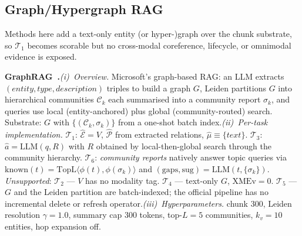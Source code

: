 \documentclass{article}
\begin{document}
\subsection{Graph/Hypergraph RAG}\label{app:b-graph}

Methods here add a text-only entity (or hyper-)graph over the chunk substrate, so $\mathcal{T}_1$ becomes scorable but no cross-modal coreference, lifecycle, or omnimodal evidence is exposed.

\noindent\textbf{GraphRAG~\citep{GraphRAG}.}\quad\emph{(i)~Overview.} Microsoft's graph-based RAG: an LLM extracts $(entity, type, description)$ triples to build a graph $G$, Leiden partitions $G$ into hierarchical communities $\mathcal{C}_k$ each summarised into a community report $\sigma_k$, and queries use local (entity-anchored) plus global (community-routed) search. Substrate: $G$ with $\{(\mathcal{C}_k,\sigma_k)\}$ from a one-shot batch index.\quad\emph{(ii)~Per-task implementation.} $\mathcal{T}_1$: $\hat{\mathcal{E}}\!=\!V$, $\hat{\mathcal{P}}$ from extracted relations, $\hat{\mu}\!\equiv\!\{\textit{text}\}$. $\mathcal{T}_3$: $\hat{a}\!=\!\mathrm{LLM}(q,R)$ with $R$ obtained by local-then-global search through the community hierarchy. $\mathcal{T}_6$: \emph{community reports} natively answer topic queries via $\mathrm{known}(t)\!=\!\mathrm{TopL}\langle\phi(t),\phi(\sigma_k)\rangle$ and $(\mathrm{gaps},\mathrm{sug})\!=\!\mathrm{LLM}(t,\{\sigma_k\})$. \emph{Unsupported}: $\mathcal{T}_2$ — $V$ has no modality tag. $\mathcal{T}_4$ — text-only $G$, $\mathrm{XMEv}\!=\!0$. $\mathcal{T}_5$ — $G$ and the Leiden partition are batch-indexed; the official pipeline has no incremental delete or refresh operator.\quad\emph{(iii)~Hyperparameters.} chunk $300$, Leiden resolution $\gamma\!=\!1.0$, summary cap $300$ tokens, top-$L\!=\!5$ communities, $k_v\!=\!10$ entities, hop expansion off.
\end{document}
